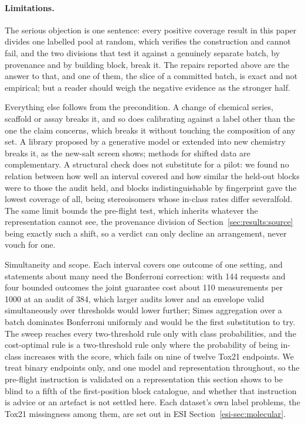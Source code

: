 \documentclass[twocolumn,10pt]{article}
\begin{document}
\paragraph{Limitations.} The serious objection is one sentence: every positive coverage
result in this paper divides one labelled pool at random, which verifies the construction and
cannot fail, and the two divisions that test it against a genuinely separate batch, by provenance and by building block, break it. The repairs reported above are the answer to
that, and one of them, the slice of a committed batch, is exact and not empirical; but a
reader should weigh the negative evidence as the stronger half.

Everything else follows from the precondition. A change of chemical series, scaffold or assay
breaks it, and so does calibrating against a label other than the one the claim concerns, which
breaks it without touching the composition of any set. A library proposed by a generative model
or extended into new chemistry breaks it, as the new-salt screen
shows;\citep{Fannjiang2022FeedbackCovariateShift,BarberBeyond2023} methods for shifted data are
complementary. A structural check does not substitute for a pilot: we found no relation between
how well an interval covered and how similar the held-out blocks were to those the audit held,
and blocks indistinguishable by fingerprint gave the lowest coverage of all, being stereoisomers
whose in-class rates differ severalfold. The same limit bounds the pre-flight test, which
inherits whatever the representation cannot see, the provenance division of Section~\ref{sec:results:source} being exactly such a shift, so a verdict can only decline an arrangement, never vouch for one.

Simultaneity and scope. Each interval covers one outcome of one setting, and statements about
many need the Bonferroni correction: with 144 requests and four bounded outcomes the joint
guarantee cost about 110 measurements per 1000 at an audit of 384, which larger audits lower and
an envelope valid simultaneously over thresholds would lower
further;\citep{Song2026FDP} Simes aggregation over a batch dominates Bonferroni
uniformly\citep{Gazin2025Batch} and would be the first substitution to try. The
sweep reaches every two-threshold rule only with class probabilities, and the cost-optimal rule
is a two-threshold rule only where the probability of being in-class increases with the score,
which fails on nine of twelve Tox21 endpoints. We treat binary endpoints only, and one model and representation throughout, so the pre-flight instruction is validated on a representation this
section shows to be blind to a fifth of the first-position block catalogue, and whether that
instruction is advice or an artefact is not settled here. Each dataset's own label problems, the
Tox21 missingness among them, are set out in ESI Section~\ref{esi-sec:molecular}.
\end{document}
